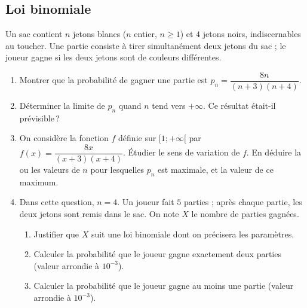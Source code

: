 \subsection*{Loi binomiale}
\begin{exo}\label{exo:proba-17}
Un sac contient $n$ jetons blancs ($n$ entier, $n \geq 1$) et $4$ jetons noirs, indiscernables au toucher.
Une partie consiste \`a tirer simultan\'ement deux jetons du sac ; le joueur gagne si les deux jetons sont de couleurs diff\'erentes.
\begin{enumerate}
\item Montrer que la probabilit\'e de gagner une partie est $p_n = \dfrac{8n}{(n+3)(n+4)}$.
\item D\'eterminer la limite de $p_n$ quand $n$ tend vers $+\infty$. Ce r\'esultat \'etait-il pr\'evisible\,?
\item On consid\`ere la fonction $f$ d\'efinie sur $[1 ; +\infty[$ par $f(x) = \dfrac{8x}{(x+3)(x+4)}$.
      \'Etudier le sens de variation de $f$.
      En d\'eduire la ou les valeurs de $n$ pour lesquelles $p_n$ est maximale, et la valeur de ce maximum.
\item Dans cette question, $n = 4$. Un joueur fait $5$ parties ; apr\`es chaque partie, les deux jetons sont remis dans le sac.
      On note $X$ le nombre de parties gagn\'ees.
      \begin{enumerate}
      \item Justifier que $X$ suit une loi binomiale dont on pr\'ecisera les param\`etres.
      \item Calculer la probabilit\'e que le joueur gagne exactement deux parties (valeur arrondie \`a $10^{-3}$).
      \item Calculer la probabilit\'e que le joueur gagne au moins une partie (valeur arrondie \`a $10^{-3}$).
      \end{enumerate}
\end{enumerate}
\end{exo}
%
